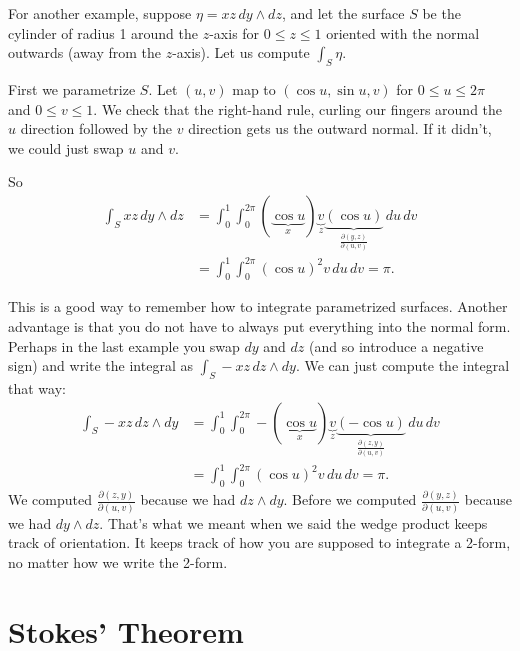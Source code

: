 \documentclass[12pt]{article}
\begin{document}
For another example, suppose $\eta = xz \, dy \wedge dz$,
and let the surface $S$ be the cylinder of radius 1 around the $z$-axis
for $0 \leq z \leq 1$ oriented with the normal outwards (away from the
$z$-axis).   Let us compute $\int_S \eta$.

First we parametrize $S$.  Let $(u,v)$ map to $(\cos u, \sin u, v)$
for $0 \leq u \leq 2\pi$ and $0 \leq v \leq 1$.  We check that the
right-hand rule, curling our fingers around the $u$ direction followed by
the $v$ direction gets us the outward normal.  If it didn't, we could just
swap $u$ and $v$.

So
\begin{equation*}
\begin{split}
\int_S xz \, dy \wedge dz
& =
\int_0^1
\int_0^{2\pi}
(\underbrace{\cos u}_{x}) \underbrace{v}_{z}
\underbrace{( \cos u )}_{\frac{\partial (y,z)}{\partial (u,v)}}
\, du \, dv
\\
& =
\int_0^1
\int_0^{2\pi}
{(\cos u)}^2 v \, du \, dv
= \pi .
\end{split}
\end{equation*}

This is a good way to remember how to integrate parametrized surfaces.
Another advantage is that you do not have to always put everything into the normal form.
Perhaps in the last example you swap $dy$ and $dz$ (and so introduce a negative sign)
and write the integral as $\int_S -xz \, dz \wedge dy$.  We can just compute the integral
that way:
\begin{equation*}
\begin{split}
\int_S -xz \, dz \wedge dy
& =
\int_0^1
\int_0^{2\pi}
- (\underbrace{\cos u}_{x}) \underbrace{v}_{z}
\underbrace{( - \cos u )}_{\frac{\partial (z,y)}{\partial (u,v)}}
\, du \, dv
\\
& =
\int_0^1
\int_0^{2\pi}
{(\cos u)}^2 v \, du \, dv
= \pi .
\end{split}
\end{equation*}
We computed
$\frac{\partial (z,y)}{\partial (u,v)}$ because we had $dz \wedge dy$.
Before we computed
$\frac{\partial (y,z)}{\partial (u,v)}$ because we had $dy \wedge dz$.
That's what we meant when we said the wedge product keeps track of orientation.  It keeps track
of how you are supposed to integrate a 2-form, no matter how we write the 2-form.

\section*{Stokes' Theorem}
\end{document}

